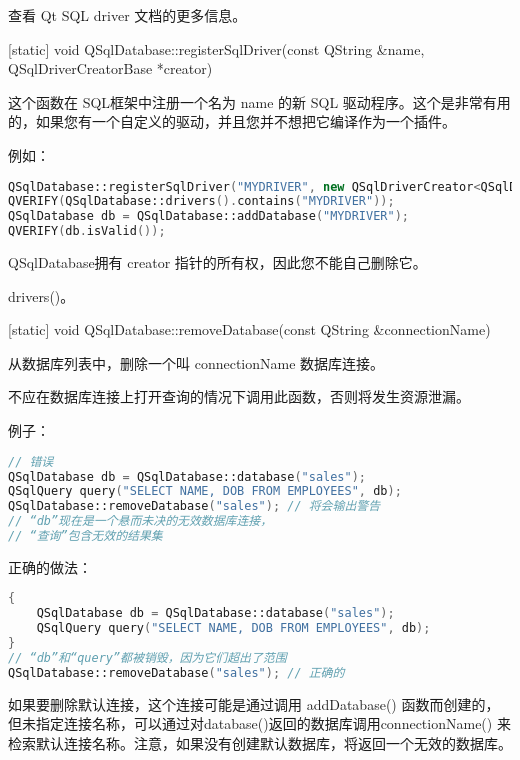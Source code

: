 查看 Qt SQL driver 文档的更多信息。

[static] void QSqlDatabase::registerSqlDriver(const QString \&name, QSqlDriverCreatorBase *creator)


这个函数在 SQL框架中注册一个名为 name 的新 SQL 驱动程序。这个是非常有用的，如果您有一个自定义的驱动，并且您并不想把它编译作为一个插件。

例如：


\begin{lstlisting}[language=C++]
QSqlDatabase::registerSqlDriver("MYDRIVER", new QSqlDriverCreator<QSqlDriver>);
QVERIFY(QSqlDatabase::drivers().contains("MYDRIVER"));
QSqlDatabase db = QSqlDatabase::addDatabase("MYDRIVER");
QVERIFY(db.isValid());
\end{lstlisting}

QSqlDatabase拥有 creator 指针的所有权，因此您不能自己删除它。

\begin{notice}[另请参阅]
drivers()。
\end{notice}

[static] void QSqlDatabase::removeDatabase(const QString \&connectionName)


从数据库列表中，删除一个叫 connectionName 数据库连接。

\begin{notice}[警告]
不应在数据库连接上打开查询的情况下调用此函数，否则将发生资源泄漏。
\end{notice}



\clearpage

例子：

\begin{lstlisting}[language=C++]
// 错误
QSqlDatabase db = QSqlDatabase::database("sales");
QSqlQuery query("SELECT NAME, DOB FROM EMPLOYEES", db);
QSqlDatabase::removeDatabase("sales"); // 将会输出警告
// “db”现在是一个悬而未决的无效数据库连接，
// “查询”包含无效的结果集
\end{lstlisting}


正确的做法：

\begin{lstlisting}[language=C++]
{
    QSqlDatabase db = QSqlDatabase::database("sales");
    QSqlQuery query("SELECT NAME, DOB FROM EMPLOYEES", db);
}
// “db”和“query”都被销毁，因为它们超出了范围
QSqlDatabase::removeDatabase("sales"); // 正确的
\end{lstlisting}

如果要删除默认连接，这个连接可能是通过调用 addDatabase() 函数而创建的，但未指定连接名称，可以通过对database()返回的数据库调用connectionName() 来检索默认连接名称。注意，如果没有创建默认数据库，将返回一个无效的数据库。

